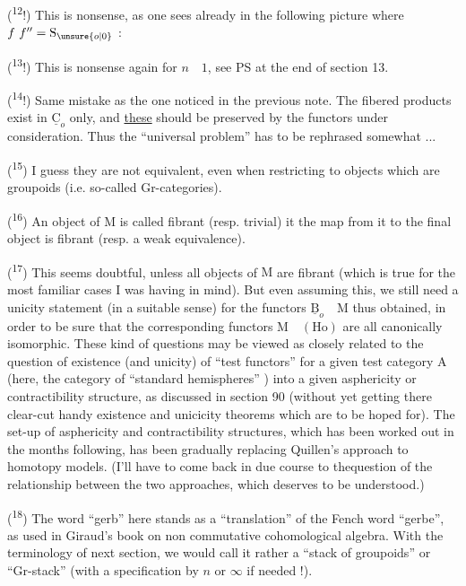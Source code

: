 
(\textsuperscript{12}!) This is nonsense, as one sees already in the following picture where $f\ f''=\mathrm{S}_{\unsure{o|0}}$ :

(\textsuperscript{13}!) This is nonsense again for $n\quad 1$, see PS at the end of section 13.

(\textsuperscript{14}!) Same mistake as  the one noticed in the previous note. The fibered products exist in $\underline{\mathrm{C}}_{o}$ only, and \uline{these} should be preserved by the functors under consideration. Thus the ``universal problem'' has to be rephrased somewhat ...

(\textsuperscript{15}) I guess they are not equivalent, even when restricting to objects which are groupoids (i.e. so-called Gr-categories).

(\textsuperscript{16}) An object of $\mathrm{M}$ is called fibrant (resp. trivial) it the map from it to the final object is fibrant (resp. a weak equivalence).

(\textsuperscript{17}) This seems doubtful, unless all objects of $\mathrm{M}$ are fibrant (which is true for the most familiar cases I was having in mind). But even assuming this, we still need a unicity statement (in a suitable sense) for the functors $\underline{\mathrm{B}}_{o}\quad \mathrm{M}$ thus obtained, in order to be sure that the corresponding functors $\mathrm{M}\quad(\mathrm{Ho})$ are all canonically isomorphic. These kind of questions may be viewed as closely related to the question of existence (and unicity) of ``test functors'' for a given test category $\mathrm{A}$ (here, the category of ``standard hemispheres'' ) into a given asphericity or contractibility structure, as discussed in section 90 (without yet getting there  clear-cut handy existence and unicicity theorems which are to be  hoped for). The set-up of asphericity and contractibility structures, which has been worked out in the months following, has been gradually replacing Quillen's approach to homotopy models. (I'll have to come back in due course to thequestion of the relationship between the two approaches, which deserves to be understood.)

(\textsuperscript{18}) The word ``gerb'' here stands  as a ``translation'' of the Fench word ``gerbe'', as used in Giraud's book on non commutative cohomological algebra. With the terminology of next section, we would call it rather a ``stack of groupoids'' or ``Gr-stack'' (with a specification by $n$ or $\infty$ if needed !).

